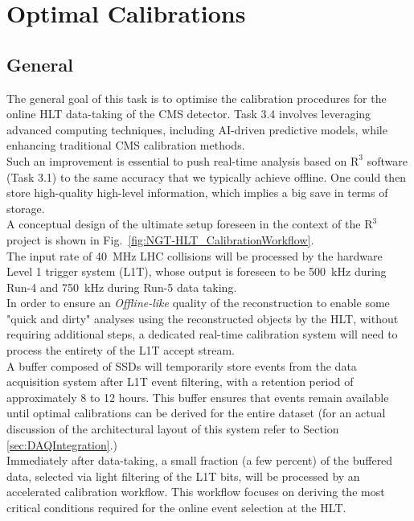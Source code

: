 \chapter{Optimal Calibrations} \label{sec:OpCa_HLT}
\section{General}

The general goal of this task is to optimise the calibration procedures for the online HLT data-taking of the CMS detector. Task 3.4 involves leveraging advanced computing techniques, including AI-driven predictive models, while enhancing traditional CMS calibration methods. \\
Such an improvement is essential to push real-time analysis based on $\mathrm{R}^3$ software (Task 3.1) to the same accuracy that we typically achieve offline. One could then store high-quality high-level information, which implies a big save in terms of storage.\\
\newline
A conceptual design of the ultimate setup foreseen in the context of the $\mathrm{R}^3$  project is shown in  Fig.~\ref{fig:NGT-HLT_CalibrationWorkflow}. \\
The input rate of \SI{40}{\mega\hertz} LHC collisions will be processed by the hardware Level 1 trigger system (L1T), whose output is foreseen to be \SI{500}{\kilo\hertz} during Run-\num{4} and \SI{750}{\kilo\hertz} during Run-\num{5} data taking. \\
\newline
In order to ensure an \emph{Offline-like} quality of the reconstruction to enable some "quick and dirty" analyses using the reconstructed objects by the HLT, without requiring additional steps, a dedicated real-time calibration system will need to process the entirety of the L1T accept stream.\\  
A buffer composed of SSDs will temporarily store events from the data acquisition system after L1T event filtering, with a retention period of approximately 8 to 12 hours. This buffer ensures that events remain available until optimal calibrations can be derived for the entire dataset (for an actual discussion of the architectural layout of this system refer to Section \ref{sec:DAQIntegration}.)\\
\newline
Immediately after data-taking, a small fraction (a few percent) of the buffered data, selected via light filtering of the L1T bits, will be processed by an accelerated calibration workflow. This workflow focuses on deriving the most critical conditions required for the online event selection at the HLT.\\
